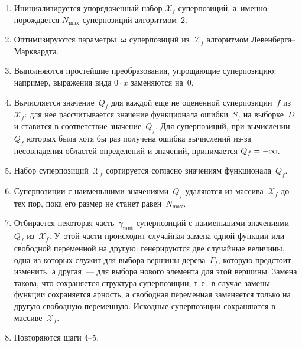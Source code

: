\begin{multicols}{2}
\noindent
\begin{enumerate}
  \item Инициализируется упорядоченный набор $\mathcal{X}_f$ суперпозиций,
    а~именно: порождается $N_{\max}$ суперпозиций алгоритмом~2.
  \item Оптимизируются параметры~$\boldsymbol{\omega}$ суперпозиций
    из~$\mathcal{X}_f$ алгоритмом Ле\-вен\-бер\-га--Марк\-вард\-та.
  \item Выполняются простейшие преобразования, упрощающие суперпозицию:
    например, выражения вида $0 \cdot x$ заменяются на~0.
  \item Вычисляется значение~$Q_f$ для каждой еще не оцененной суперпозиции~$f$ 
  из~$\mathcal{X}_f$: для нее рассчитывается значение функционала ошибки~$S_f$ 
  на выборке~$D$ и ставится в соответствие значение~$Q_f$. Для
    суперпозиций, при вычислении~$Q_f$ которых была хотя бы раз получена
    ошибка вычислений из-за несовпадения областей определений и значений,
    принимается $Q_f \hm= -\infty$.
  \item Набор суперпозиций~$\mathcal{X}_f$ сортируется согласно значениям
    функционала~$Q_f$.
  \item Суперпозиции с наименьшими значениями~$Q_f$ удаляются из массива~$\mathcal{X}_f$ 
  до тех пор, пока его размер не станет равен~$N_{\max}$.
  \item Отбирается некоторая часть~$\gamma_{\mathrm{mut}}$ суперпозиций с наименьшими
    значениями~$Q_f$ из~$\mathcal{X}_f$. У~этой час\-ти происходит случайная замена
    одной функции или свободной переменной на другую: генерируются две случайные величины,
    одна из которых служит для выбора вершины дерева~$\Gamma_f$, которую
    предстоит изменить, а другая~--- для выбора нового элемента для этой вершины.
    Замена такова, что сохраняется структура суперпозиции, т.\,е.\
    в случае замены функции сохраняется арность, а свободная переменная
    заменяется только на другую свободную переменную. Исходные
    суперпозиции сохраняются в массиве~$\mathcal{X}_f$.
  \item Повторяются шаги 4--5.
  
  \begin{figure*} %
\vspace*{1pt}
 \begin{center}
 \mbox{%
 \epsfxsize=112.519mm
 }
 \end{center}
 \vspace*{-9pt}
  \label{fig:fitness_surph}
\end{figure*}


\end{enumerate}
\end{multicols}
